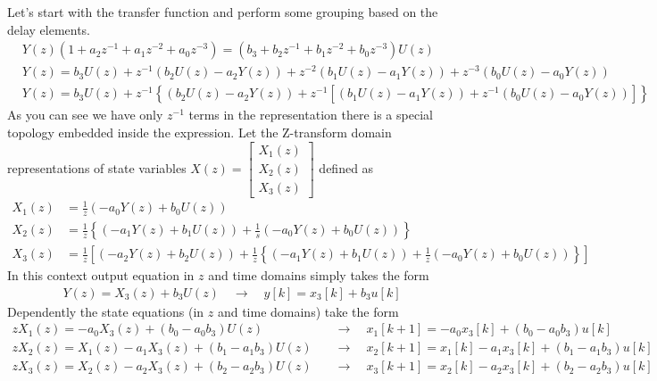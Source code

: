 \documentclass[twoside]{article}
\begin{document}
Let's start with the transfer function 
and perform some grouping based on the delay elements.
%
\begin{align*}
&Y(z) ( 1+ a_2 z^{-1} + a_1 z^{-2} + a_0 z^{-3} ) 
= ( b_3 + b_2 z^{-1} + b_1 z^{-2} + b_0 z^{-3} ) U(z)
\\
&Y(z) = b_3 U(z) + z^{-1} \left( b_2 U(z) - a_2 Y(z) \right) + z^{-2} \left( b_1 U(z) -
  a_1 Y(z) \right) + z^{-3} \left( b_0 U(z) - a_0 Y(z) \right)
\\
&Y(z) = b_3 U(z) + z^{-1} \left\lbrace \left( b_2 U(z) - a_2 Y(z) \right) + z^{-1} \left[ \left( b_1 U(z) -
  a_1 Y(z) \right) + z^{-1} \left( b_0 U(z) - a_0 Y(z) \right) \right] \right\rbrace
\end{align*}
%
As you can see we have only $z^{-1}$ terms in the representation there
is a special topology embedded inside the expression. Let the
Z-transform domain representations of state variables 
$X(z) = \left[ \begin{array}{c} X_1(z) \\ X_2(z) \\ X_3(z) \end{array} \right]$ defined as 
%
\begin{align*}
X_1(z) &= \frac{1}{z} \left( -a_0 Y(z) + b_0 U(z) \right)
\\
X_2(z) &= \frac{1}{z}  \left\lbrace \left( -a_1 Y(z) + b_1 U(z) \right) + 
\frac{1}{s} \left( -a_0 Y(z) + b_0 U(z) \right) \right\rbrace
\\
X_3(z) &= \frac{1}{z} \left[ \left( -a_2 Y(z) + b_2 U(z) \right) + \frac{1}{z}  \left\lbrace \left( -a_1 Y(z) + b_1 U(z) \right) + 
\frac{1}{z} \left( -a_0 Y(z) + b_0 U(z) \right) \right\rbrace \right]
\end{align*}
%
In this context output equation in $z$ and time domains simply takes the form
%
\begin{align*}
	Y(z) = X_3(z) + b_3 U(z) \quad \rightarrow \quad y[k] = x_3[k] + b_3 u[k]
\end{align*}
% 
Dependently the state equations (in $z$ and time domains) take the form
%
%
\begin{align*}
z X_1(z) = -a_0 X_3(z)  + ( b_0 - a_0 b_3) U(z) \quad &\rightarrow \quad x_1[k+1] = -a_0 x_3[k]  + ( b_0 - a_0 b_3) u[k]
\\
z X_2(z) = X_1(z)  -a_1 X_3(z) + ( b_1 - a_1 b_3 ) U(z)  \quad &\rightarrow \quad x_2[k+1] = x_1[k]  - a_1 x_3[k] + ( b_1 - a_1 b_3 ) u[k]
\\
z X_3(z) = X_2(z)  -a_2 X_3(z) + ( b_2 - a_2 b_3 ) U(z)  \quad &\rightarrow \quad x_3[k+1] = x_2[k]  - a_2 x_3[k] + ( b_2 - a_2 b_3 ) u[k]
\end{align*}
\end{document}
